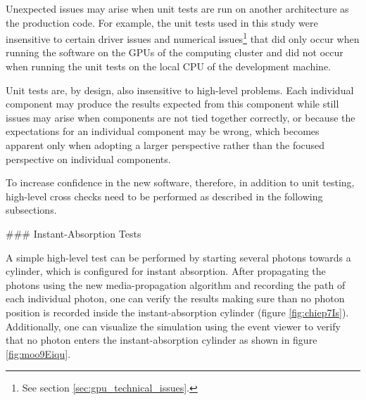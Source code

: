 Unexpected issues may arise when unit tests are run on another architecture as the production code. For example, the unit tests used in this study were insensitive to certain driver issues and numerical issues\footnote{See section \ref{sec:gpu_technical_issues}.} that did only occur when running the software on the GPUs of the computing cluster and did not occur when running the unit tests on the local CPU of the development machine.

Unit tests are, by design, also insensitive to high-level problems. Each individual component may produce the results expected from this component while still issues may arise when components are not tied together correctly, or because the expectations for an individual component may be wrong, which becomes apparent only when adopting a larger perspective rather than the focused perspective on individual components.

To increase confidence in the new software, therefore, in addition to unit testing, high-level cross checks need to be performed as described in the following subsections.


### Instant-Absorption Tests
\label{sec:instant_absorption_tests}

A simple high-level test can be performed by starting several photons towards a cylinder, which is configured for instant absorption. After propagating the photons using the new media-propagation algorithm and recording the path of each individual photon, one can verify the results making sure than no photon position is recorded inside the instant-absorption cylinder (figure \ref{fig:chiep7Is}).
Additionally, one can visualize the simulation using the \steamshovel event viewer to verify that no photon enters the instant-absorption cylinder as shown in figure \ref{fig:moo9Eiqu}.


